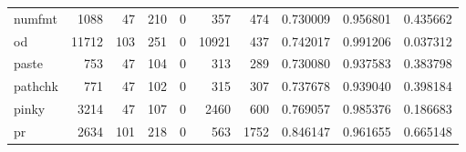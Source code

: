 \begin{tabular}{lrrrrrrrrr}
numfmt    &                                               1088 &                                                 47 &                                                210 &                                                  0 &                                                357 &                                                474 &                                           0.730009 &                               0.956801 &                             0.435662 \\
od        &                                              11712 &                                                103 &                                                251 &                                                  0 &                                              10921 &                                                437 &                                           0.742017 &                               0.991206 &                             0.037312 \\
paste     &                                                753 &                                                 47 &                                                104 &                                                  0 &                                                313 &                                                289 &                                           0.730080 &                               0.937583 &                             0.383798 \\
pathchk   &                                                771 &                                                 47 &                                                102 &                                                  0 &                                                315 &                                                307 &                                           0.737678 &                               0.939040 &                             0.398184 \\
pinky     &                                               3214 &                                                 47 &                                                107 &                                                  0 &                                               2460 &                                                600 &                                           0.769057 &                               0.985376 &                             0.186683 \\
pr        &                                               2634 &                                                101 &                                                218 &                                                  0 &                                                563 &                                               1752 &                                           0.846147 &                               0.961655 &                             0.665148 \\

\end{tabular}
